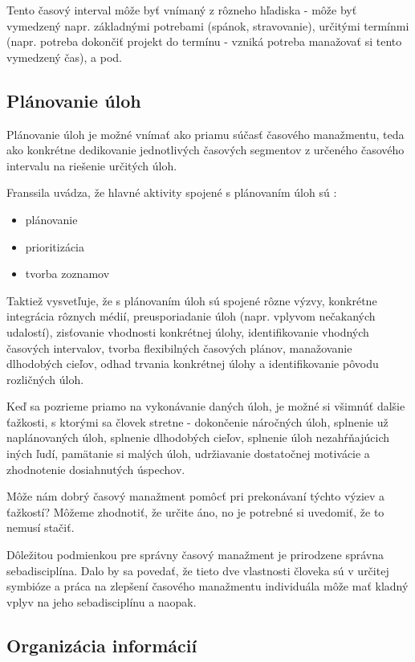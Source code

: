 \documentclass[10pt,slovak,a4paper]{article}
\begin{document}
		Tento časový interval môže byť vnímaný z rôzneho hľadiska - môže byť vymedzený napr. základnými potrebami (spánok, stravovanie), určitými termínmi (napr. potreba dokončiť projekt do termínu - vzniká potreba manažovať si tento vymedzený čas), a pod.
		
	\subsection{Plánovanie úloh}
	
		Plánovanie úloh je možné vnímať ako priamu súčasť časového manažmentu, teda ako konkrétne dedikovanie jednotlivých časových segmentov z určeného časového intervalu na riešenie určitých úloh.
		
		Franssila uvádza, že hlavné aktivity spojené s plánovaním úloh sú \cite{Franssila}:
		\begin{itemize}
			\item plánovanie
			\item prioritizácia
			\item tvorba zoznamov
		\end{itemize}
		
		Taktiež vysvetľuje, že s plánovaním úloh sú spojené rôzne výzvy, konkrétne integrácia rôznych médií, preusporiadanie úloh (napr. vplyvom nečakaných udalostí), zisťovanie vhodnosti konkrétnej úlohy, identifikovanie vhodných časových intervalov, tvorba flexibilných časových plánov, manažovanie dlhodobých cieľov, odhad trvania konkrétnej úlohy a identifikovanie pôvodu rozličných úloh\cite{Franssila}.
		
		Keď sa pozrieme priamo na vykonávanie daných úloh, je možné si všimnúť dalšie ťažkosti, s ktorými sa človek stretne - dokončenie náročných úloh, splnenie už naplánovaných úloh, splnenie dlhodobých cieľov, splnenie úloh nezahŕňajúcich iných ľudí, pamätanie si malých úloh, udržiavanie dostatočnej motivácie a zhodnotenie dosiahnutých úspechov\cite{Franssila}.
		
		Môže nám dobrý časový manažment pomôcť pri prekonávaní týchto výziev a ťažkostí? Môžeme zhodnotiť, že určite áno, no je potrebné si uvedomiť, že to nemusí stačiť.
		
		Dôležitou podmienkou pre správny časový manažment je prirodzene správna sebadisciplína. Dalo by sa povedať, že tieto dve vlastnosti človeka sú v určitej symbióze a práca na zlepšení časového manažmentu individuála môže mať kladný vplyv na jeho sebadisciplínu a naopak.
		
	\subsection{Organizácia informácií}
	
\end{document}
